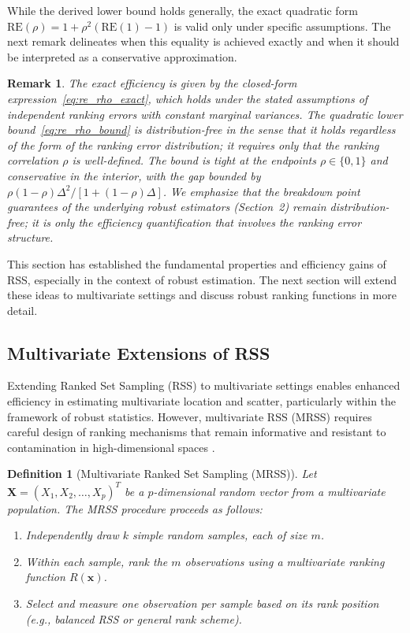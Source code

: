 \documentclass[12pt]{article}
\newtheorem{definition}{Definition}[section] %
\newtheorem{remark}{Remark}[section]
\begin{document}
While the derived lower bound holds generally, the exact quadratic form $\text{RE}(\rho) = 1 + \rho^2 (\text{RE}(1) - 1)$ is valid only under specific assumptions. The next remark delineates when this equality is achieved exactly and when it should be interpreted as a conservative approximation.

\begin{remark}
The exact efficiency is given by the closed-form expression~\eqref{eq:re_rho_exact}, which holds under the stated assumptions of independent ranking errors with constant marginal variances. The quadratic lower bound~\eqref{eq:re_rho_bound} is distribution-free in the sense that it holds regardless of the form of the ranking error distribution; it requires only that the ranking correlation $\rho$ is well-defined. The bound is tight at the endpoints $\rho \in \{0, 1\}$ and conservative in the interior, with the gap bounded by $\rho(1-\rho)\Delta^2/[1+(1-\rho)\Delta]$. We emphasize that the breakdown point guarantees of the underlying robust estimators (Section~2) remain distribution-free; it is only the \emph{efficiency} quantification that involves the ranking error structure.
\end{remark}

This section has established the fundamental properties and efficiency gains of RSS, especially in the context of robust estimation. The next section will extend these ideas to multivariate settings and discuss robust ranking functions in more detail.

\subsection{Multivariate Extensions of RSS}
Extending Ranked Set Sampling (RSS) to multivariate settings enables enhanced efficiency in estimating multivariate location and scatter, particularly within the framework of robust statistics. However, multivariate RSS (MRSS) requires careful design of ranking mechanisms that remain informative and resistant to contamination in high-dimensional spaces \cite{taconeli2023}.
\begin{definition}[Multivariate Ranked Set Sampling (MRSS)]
Let $\mathbf{X} = (X_1, X_2, \ldots, X_p)^T$ be a $p$-dimensional random vector from a multivariate population. The MRSS procedure proceeds as follows:
\begin{enumerate}
    \item Independently draw $k$ simple random samples, each of size $m$.
    \item Within each sample, rank the $m$ observations using a multivariate ranking function $R(\mathbf{x})$.
    \item Select and measure one observation per sample based on its rank position (e.g., balanced RSS or general rank scheme).
\end{enumerate}
\end{definition}
\end{document}
